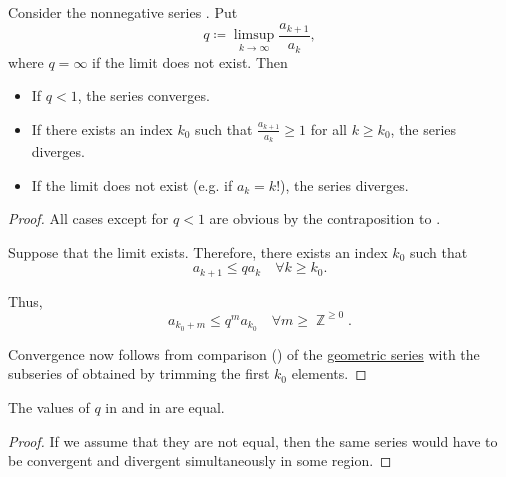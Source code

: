 \begin{proposition}\label{thm:dalamberts_ratio_test}
  Consider the nonnegative series . Put
  \begin{equation*}
    q \coloneqq \limsup_{k \to \infty} \frac {a_{k+1}} {a_k},
  \end{equation*}
  where \( q = \infty \) if the limit does not exist. Then
  \begin{itemize}
    \item If \( q < 1 \), the series converges.
    \item If there exists an index \( k_0 \) such that \( \frac {a_{k+1}} {a_k} \geq 1 \) for all \( k \geq k_0 \), the series diverges.
    \item If the limit does not exist (e.g. if \( a_k = k! \)), the series diverges.
  \end{itemize}
\end{proposition}
\begin{proof}
  All cases except for \( q < 1 \) are obvious by the contraposition to .

  Suppose that the limit exists. Therefore, there exists an index \( k_0 \) such that
  \begin{equation*}
    a_{k+1} \leq q a_k \quad\forall k \geq k_0.
  \end{equation*}

  Thus,
  \begin{equation*}
    a_{k_0 + m} \leq q^m a_{k_0} \quad\forall m \geq \BbbZ^{\geq 0}.
  \end{equation*}

  Convergence now follows from comparison () of the \hyperref[thm:geometric_series_properties/series]{geometric series} with the subseries of  obtained by trimming the first \( k_0 \) elements.
\end{proof}

\begin{proposition}\label{rem:nonnegative_series_convergence_test_equivalence}
  The values of \( q \) in  and in  are equal.
\end{proposition}
\begin{proof}
  If we assume that they are not equal, then the same series would have to be convergent and divergent simultaneously in some region.
\end{proof}

